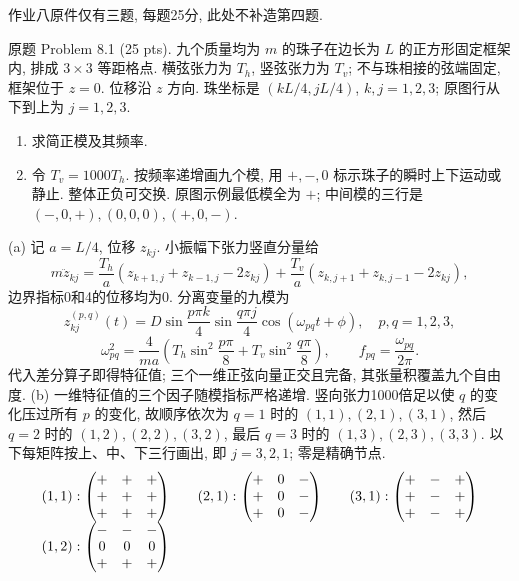 作业八原件仅有三题, 每题25分, 此处不补造第四题.
\begin{exercise}\label{ps:8.1}
原题 Problem 8.1 (25 pts). 九个质量均为 $m$ 的珠子在边长为 $L$ 的正方形固定框架内, 排成 $3\times3$ 等距格点. 横弦张力为 $T_h$, 竖弦张力为 $T_v$; 不与珠相接的弦端固定, 框架位于 $z=0$. 位移沿 $z$ 方向. 珠坐标是 $(kL/4,jL/4)$, $k,j=1,2,3$; 原图行从下到上为 $j=1,2,3$.
\begin{enumerate}[label=\alph*.]
\item 求简正模及其频率.
\item 令 $T_v=1000T_h$. 按频率递增画九个模, 用 $+,-,0$ 标示珠子的瞬时上下运动或静止. 整体正负可交换. 原图示例最低模全为 $+$; 中间模的三行是 $(-,0,+),(0,0,0),(+,0,-)$.
\end{enumerate}
\end{exercise}
\begin{solution}
(a) 记 $a=L/4$, 位移 $z_{kj}$. 小振幅下张力竖直分量给
\[
m\ddot z_{kj}=\frac{T_h}{a}(z_{k+1,j}+z_{k-1,j}-2z_{kj})+
\frac{T_v}{a}(z_{k,j+1}+z_{k,j-1}-2z_{kj}),
\]
边界指标0和4的位移均为0. 分离变量的九模为
\[
z^{(p,q)}_{kj}(t)=D\sin\frac{p\pi k}{4}\sin\frac{q\pi j}{4}\cos(\omega_{pq}t+\phi),
\quad p,q=1,2,3,
\]
\[
\omega_{pq}^2=\frac4{ma}\left(T_h\sin^2\frac{p\pi}{8}+T_v\sin^2\frac{q\pi}{8}\right),\qquad f_{pq}=\frac{\omega_{pq}}{2\pi}.
\]
代入差分算子即得特征值; 三个一维正弦向量正交且完备, 其张量积覆盖九个自由度.
(b) 一维特征值的三个因子随模指标严格递增. 竖向张力1000倍足以使 $q$ 的变化压过所有 $p$ 的变化, 故顺序依次为 $q=1$ 时的 $(1,1),(2,1),(3,1)$, 然后 $q=2$ 时的 $(1,2),(2,2),(3,2)$, 最后 $q=3$ 时的 $(1,3),(2,3),(3,3)$. 以下每矩阵按上、中、下三行画出, 即 $j=3,2,1$; 零是精确节点.
\[
\begin{array}{c@{\qquad}c@{\qquad}c}
(1,1):\begin{pmatrix}+&+&+\\+&+&+\\+&+&+\end{pmatrix}&
(2,1):\begin{pmatrix}+&0&-\\+&0&-\\+&0&-\end{pmatrix}&
(3,1):\begin{pmatrix}+&-&+\\+&-&+\\+&-&+\end{pmatrix}\\[8pt]
(1,2):\begin{pmatrix}-&-&-\\0&0&0\\+&+&+\end{pmatrix}&

\end{array}\]
\end{solution}
